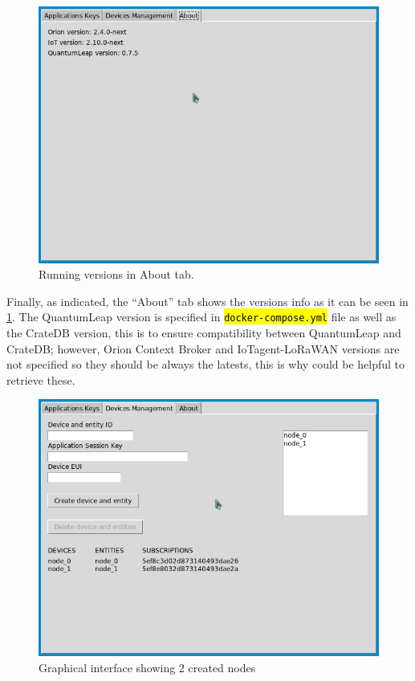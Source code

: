 \documentclass[11pt,a4paper,dvipsnames,twoside]{article}
\newcommand{\cmd}[1] {\hl{\texttt{#1}}}
\begin{document}
\begin{figure}[htp]
  \centering
  \includegraphics[width=.9\textwidth]{../pictures/GUI_about_tab.png}
  \caption{Running versions in About tab.}
  \label{fig:about_tab}
\end{figure}

Finally, as indicated, the \enquote{About} tab shows the versions info as it can be seen in \ref{fig:about_tab}. The QuantumLeap version is specified in \cmd{docker-compose.yml} file as well as the CrateDB version, this is to ensure compatibility between QuantumLeap and CrateDB; however, Orion Context Broker and IoTagent-LoRaWAN versions are not specified so they should be always the latests, this is why could be helpful to retrieve these. 

\begin{figure}[ht]
  \centering
  \includegraphics[width=.9\textwidth]{../pictures/GUI_device_management_2nodes.png}
  \caption{Graphical interface showing 2 created nodes}
  \label{fig:GUI_2nodes}
\end{figure}
\end{document}
